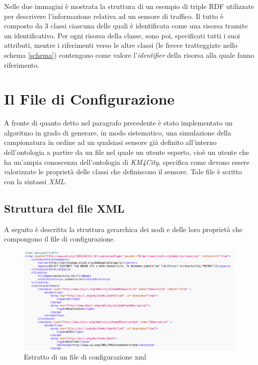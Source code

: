 \documentclass[12pt,a4paper,italian]{article}
\begin{document}
\newline
Nelle due immagini è mostrata la struttura di un esempio di triple RDF utilizzate per descrivere l'informazione relativa ad un sensore di traffico. Il tutto è composto da 3 classi ciascuna delle quali è identificata come una risorsa tramite un identificativo. Per ogni risorsa della classe, sono poi, specificati tutti i suoi attributi, mentre i riferimenti verso le altre classi (le frecce tratteggiate nello schema \ref{schema}) contengono come valore l'\emph{identifier} della risorsa alla quale fanno riferimento. 
\newpage

\section{Il File di Configurazione}
A fronte di quanto detto nel paragrafo precedente è stato implementato un algoritmo in grado di generare, in modo sistematico, una simulazione della campionatura in ordine ad un qualsiasi  sensore già definito all'interno dell'ontologia a partire da un file nel quale un utente esperto, cioè un utente che ha un'ampia conoscenza dell'ontologia di \emph{KM4City}, specifica come devono essere valorizzate le proprietà 
delle classi che definiscono il sensore. Tale file è scritto con la sintassi \emph{XML}.

\subsection{Struttura del file XML}
A seguito è descritta la struttura gerarchica dei nodi e delle loro proprietà che compongono il file di configurazione.\\

\begin{figure}[h!]
	\centering
	\includegraphics[width=14cm]{img/configxml.png}
	\caption{Estratto di un file di configurazione xml}\label{configxml}
\end{figure}
\end{document}
